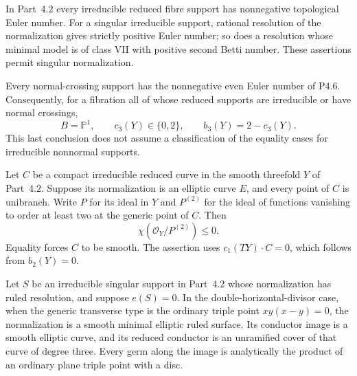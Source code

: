 
\begin{proposition}[P4.26]\hypertarget{tag-02WY}{}\label{night:P4.26}\label{stmt:P4.26}


In Part~4.2 every irreducible reduced fibre support
has nonnegative topological Euler number. For a
singular irreducible support, rational resolution
of the normalization gives strictly positive
Euler number; so does a resolution whose minimal
model is of class VII with positive second
Betti number. These assertions permit singular
normalization.

Every normal-crossing support has the
nonnegative even Euler number of P4.6.
Consequently, for a fibration all of whose
reduced supports are irreducible or have
normal crossings,
\[
 B=\mathbb P^1,\qquad c_3(Y)\in\{0,2\},
 \qquad b_3(Y)=2-c_3(Y).
\]
This last conclusion does not assume a
classification of the equality cases for
irreducible nonnormal supports.
\end{proposition}

\begin{proposition}[P4.30]\hypertarget{tag-02X3}{}\label{night:P4.30}\label{stmt:P4.30}


Let $C$ be a compact irreducible reduced curve in the smooth
threefold $Y$ of Part~4.2. Suppose its normalization is an elliptic
curve $E$, and every point of $C$ is unibranch. Write $P$ for its
ideal in $Y$ and $P^{(2)}$ for the ideal of functions vanishing to
order at least two at the generic point of $C$. Then
\[
 \chi(\mathcal O_Y/P^{(2)})\le0.
\]
Equality forces $C$ to be smooth. The assertion uses
$c_1(TY)\cdot C=0$, which follows from $b_2(Y)=0$.
\end{proposition}

\begin{proposition}[P4.31]\hypertarget{tag-02X4}{}\label{night:P4.31}\label{stmt:P4.31}


Let $S$ be an irreducible singular support in Part~4.2 whose
normalization has ruled resolution, and suppose $e(S)=0$.
In the double-horizontal-divisor case, when the generic
transverse type is the ordinary triple point $xy(x-y)=0$,
the normalization is a smooth minimal elliptic ruled surface.
Its conductor image is a smooth elliptic curve, and its
reduced conductor is an unramified cover of that curve of
degree three. Every germ along the image is analytically
the product of an ordinary plane triple point with a disc.
\end{proposition}

